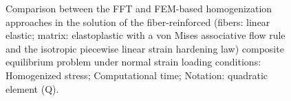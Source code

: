 \begin{figure}[hbt]
\begin{subfigure}[b]{0.49\textwidth}
      \caption{}
      \label{subfig:von_mises_res_mat_small_strain_2D_normal_material_response_error}
    \end{subfigure}
  \caption{Comparison between the FFT and FEM-based homogenization approaches in the solution
  of the fiber-reinforced (fibers: linear elastic; matrix: elastoplastic with a von Mises associative flow rule and the isotropic piecewise linear strain hardening law) composite equilibrium problem under normal strain
  loading conditions:  Homogenized
  stress;  Computational time;
  Notation: quadratic element (Q).}
\label{fig:von_mises_res_mat_small_strain_2D_normal_material_response_and_error}
\end{figure}

